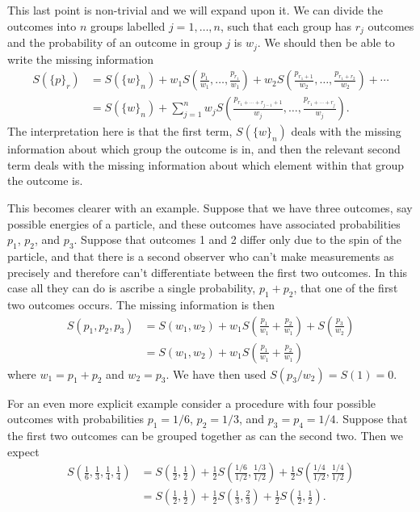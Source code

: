 \documentclass[fleqn]{NotesClass}
\begin{document}
    This last point is non-trivial and we will expand upon it.
    We can divide the outcomes into \(n\) groups labelled \(j = 1, \dotsc, n\), such that each group has \(r_j\) outcomes and the probability of an outcome in group \(j\) is \(w_j\).
    We should then be able to write the missing information
    \begin{align}
        S(\{p\}_r) &= S(\{w\}_n) + w_1S\left( \frac{p_1}{w_1}, \dotsc, \frac{p_{r_{1}}}{w_1} \right) + w_2S\left( \frac{p_{r_1+1}}{w_2}, \dotsc, \frac{p_{r_1 + r_2}}{w_2} \right) + \dotsb\\
        &= S(\{w\}_{n}) + \sum_{j=1}^{n} w_jS\left( \frac{p_{r_1 + \dotsb + r_{j-1} + 1}}{w_j}, \dotsc, \frac{p_{r_1 + \dotsb + r_j}}{w_j} \right).\label{eqn:entropy grouping}
    \end{align}
    The interpretation here is that the first term, \(S(\{w\}_n)\) deals with the missing information about which group the outcome is in, and then the relevant second term deals with the missing information about which element within that group the outcome is.
    
    This becomes clearer with an example.
    Suppose that we have three outcomes, say possible energies of a particle, and these outcomes have associated probabilities \(p_1\), \(p_2\), and \(p_3\).
    Suppose that outcomes 1 and 2 differ only due to the spin of the particle, and that there is a second observer who can't make measurements as precisely and therefore can't differentiate between the first two outcomes.
    In this case all they can do is ascribe a single probability, \(p_1 + p_2\), that one of the first two outcomes occurs.
    The missing information is then
    \begin{align}
        S(p_1, p_2, p_3) &= S(w_1, w_2) + w_1S\left( \frac{p_1}{w_1} + \frac{p_2}{w_1} \right) + S\left( \frac{p_3}{w_2} \right)\\
        &= S(w_1, w_2) + w_1S\left( \frac{p_1}{w_1} + \frac{p_2}{w_1} \right)
    \end{align}
    where \(w_1 = p_1 + p_2\) and \(w_2 = p_3\).
    We have then used \(S(p_3/w_2) = S(1) = 0\).
    
    For an even more explicit example consider a procedure with four possible outcomes with probabilities \(p_1 = 1/6\), \(p_2 = 1/3\), and \(p_3 = p_4 = 1/4\).
    Suppose that the first two outcomes can be grouped together as can the second two.
    Then we expect
    \begin{align}
        S\left( \frac{1}{6}, \frac{1}{3}, \frac{1}{4}, \frac{1}{4} \right) &= S\left( \frac{1}{2}, \frac{1}{2} \right) + \frac{1}{2}S\left( \frac{1/6}{1/2}, \frac{1/3}{1/2} \right) + \frac{1}{2} S\left( \frac{1/4}{1/2}, \frac{1/4}{1/2} \right)\\
        &= S\left( \frac{1}{2}, \frac{1}{2} \right) + \frac{1}{2}S\left( \frac{1}{3}, \frac{2}{3} \right) + \frac{1}{2} S\left( \frac{1}{2}, \frac{1}{2} \right).
    \end{align}
    
\end{document}
